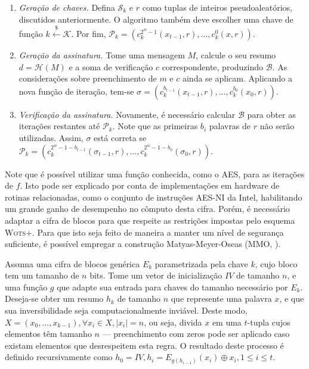 \documentclass[12pt]{report}
\newcommand{\pk}{$\mathcal{P}_k$}
\newcommand{\sk}{$\mathcal{S}_k$}
\begin{document}
\begin{enumerate}

    \item[] \emph{Geração de chaves.} Defina \sk{} e $r$ como tuplas de inteiros pseudoaleatórios, discutidos anteriormente. O algoritmo também deve escolher uma chave de função $k \stackrel{\$}\longleftarrow \mathcal{K}$. Por fim, $\text{\pk{}} = (c^{2^w-1}_{k}(x_{t-1}, r), \dots, c^{0}_{k}(x, r))$.
    
    \item[] \emph{Geração da assinatura.} Tome uma mensagem $M$, calcule o seu resumo $d = \mathcal{H}(M)$ e a soma de verificação $c$ correspondente, produzindo $\mathcal{B}$. As considerações sobre preenchimento de $m$ e $c$ ainda se aplicam. Aplicando a nova função de iteração, tem-se $\sigma = (c^{b_{t - 1}}_{k}(x_{t-1}, r), \dots, c^{b_{0}}_{k}(x_{0}, r))$.
    
    \item[] \emph{Verificação da assinatura.} Novamente, é necessário calcular $\mathcal{B}$ para obter as iterações restantes até \pk{}. Note que as primeiras $b_i$ palavras de $r$ não serão utilizadas. Assim, $\sigma$ está correta se $\text{\pk{}} = (c^{2^{w} - 1 - b_{t - 1}}_{k}(\sigma_{t-1}, r), \dots, c^{2^{w} - 1 - b_{0}}_{k}(\sigma_{0}, r))$. 

\end{enumerate}

Note que é possível utilizar uma função conhecida, como o AES, para as iterações de $f$. Isto pode ser explicado por conta de implementações em hardware de rotinas relacionadas, como o conjunto de instruções AES-NI da Intel, habilitando um grande ganho de desempenho no cômputo desta cifra. Porém, é necessário adaptar a cifra de blocos para que respeite as restrições impostas pelo esquema \textsc{Wots+}. Para que isto seja feito de maneira a manter um nível de segurança suficiente, é possível empregar a construção Matyas-Meyer-Oseas (MMO, \cite[9.41]{Menezes:1996:HAC:548089}).

Assuma uma cifra de blocos genérica $E_{k}$ parametrizada pela chave $k$, cujo bloco tem um tamanho de $n$ bits. Tome um vetor de inicialização $IV$ de tamanho $n$, e uma função $g$ que adapte sua entrada para chaves do tamanho necessário por $E_{k}$. Deseja-se obter um resumo $h_k$ de tamanho $n$ que represente uma palavra $x$, e que sua inversibilidade seja computacionalmente inviável. Deste modo, $X = (x_0, \dots, x_{k - 1}), \forall x_i \in X, \vert x_i \vert = n$, ou seja, divida $x$ em uma $t$-tupla cujos elementos têm tamanho $n$ --- preenchimento com zeros pode ser aplicado caso existam elementos que desrespeitem esta regra. O resultado deste processo é definido recursivamente como $h_0 = IV, h_i = E_{g(h_{i-1})}(x_i) \oplus x_i, 1 \leq i \leq t$.
\end{document}

